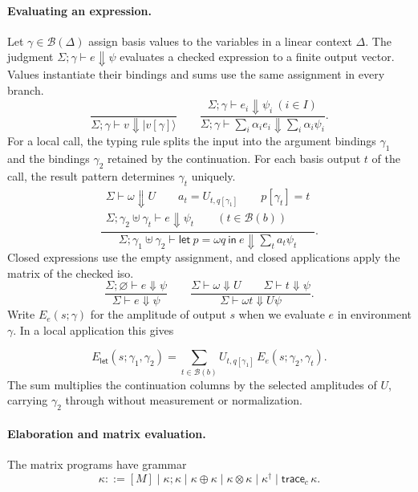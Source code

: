 \documentclass[acmsmall,screen,review,anonymous,nonacm]{acmart}
\newcommand{\ket}[1]{\lvert #1\rangle}
\numberwithin{equation}{section}
\begin{document}
\paragraph{Evaluating an expression.}
Let $\gamma\in\mathcal B(\Delta)$ assign basis values to the
variables in a linear context $\Delta$. The judgment
$\Sigma;\gamma\vdash e\Downarrow\psi$ evaluates a checked expression to a finite
output vector. Values instantiate their bindings and sums use the same assignment in every branch.
\[
 \frac{}{\Sigma;\gamma\vdash v\Downarrow\ket{v[\gamma]}}
 \qquad
 \frac{\Sigma;\gamma\vdash e_i\Downarrow\psi_i\ (i\in I)}
      {\Sigma;\gamma\vdash\sum_i\alpha_i e_i\Downarrow\sum_i\alpha_i\psi_i}.
\]
For a local call, the typing rule splits the input into the argument bindings
$\gamma_1$ and the bindings $\gamma_2$ retained by the continuation. For each
basis output $t$ of the call, the result pattern determines $\gamma_t$ uniquely.
\[
 \frac{\begin{gathered}
 \Sigma\vdash\omega\Downarrow U\qquad
 a_t=U_{t,q[\gamma_1]}\qquad p[\gamma_t]=t\\
 \Sigma;\gamma_2\uplus\gamma_t\vdash e\Downarrow\psi_t
       \qquad (t\in\mathcal B(b))
 \end{gathered}}
      {\Sigma;\gamma_1\uplus\gamma_2\vdash
        \mathsf{let}\ p=\omega q\ \mathsf{in}\ e\Downarrow\sum_t a_t\psi_t}.
\]
Closed expressions use the empty assignment, and closed applications apply
the matrix of the checked iso.
\[
 \frac{\Sigma;\varnothing\vdash e\Downarrow\psi}{\Sigma\vdash e\Downarrow\psi}
 \qquad
 \frac{\Sigma\vdash\omega\Downarrow U\qquad \Sigma\vdash t\Downarrow\psi}
      {\Sigma\vdash\omega t\Downarrow U\psi}.
\]
Write $E_e(s;\gamma)$ for the amplitude of output $s$ when we evaluate $e$ in environment $\gamma$. In a local application this gives

\[
E_{\mathsf{let}}(s;\gamma_1,\gamma_2) =\sum_{t\in\mathcal B(b)}
U_{t,q[\gamma_1]}\,E_e(s;\gamma_2,\gamma_t).
\]
The sum multiplies the continuation columns by the selected amplitudes of
$U$, carrying $\gamma_2$ through without measurement or normalization.

\paragraph{Elaboration and matrix evaluation.}
The matrix programs have grammar
\[
 \kappa::=[M]\mid\kappa;\kappa\mid\kappa\oplus\kappa
       \mid\kappa\otimes\kappa\mid\kappa^\dagger
       \mid\mathsf{trace}_c\,\kappa.
\]
\end{document}
